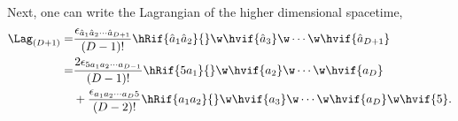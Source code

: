 Next, one can write the Lagrangian of the higher dimensional spacetime,
\begin{align}
  \Lag_{(D+1)} =& \frac{\epsilon_{\hat{a}_1\hat{a}_2\cdots\hat{a}_{D+1}}}{(D-1)!}\hRif{\hat{a}_1\hat{a}_2}{}\w\hvif{\hat{a}_3}\w\cdots\w\hvif{\hat{a}_{D+1}}\\
  =& \frac{2 \epsilon_{5a_1 a_2\cdots a_{D-1}}}{(D-1)!}\hRif{5{a}_1}{}\w\hvif{{a}_2}\w\cdots\w\hvif{{a}_{D}}\notag\\
  &+ \frac{\epsilon_{a_1 a_2\cdots a_{D}5}}{(D-2)!}\hRif{{a}_1{a}_2}{}\w\hvif{{a}_3}\w\cdots\w\hvif{{a}_{D}}\w\hvif{5}.
\end{align}

